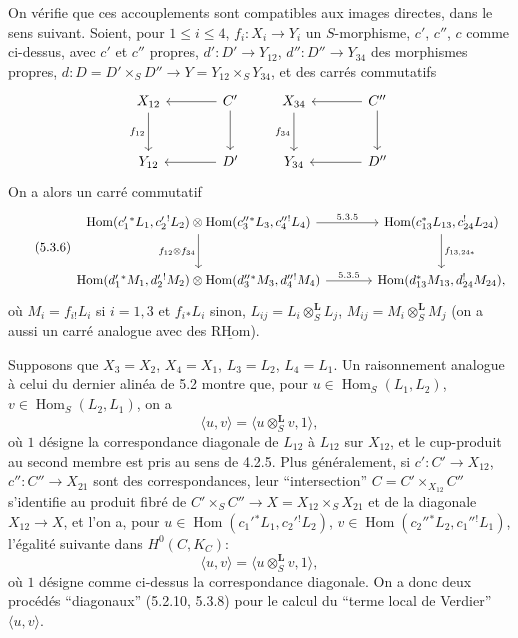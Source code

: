 \documentclass[11pt]{article}
\DeclareMathOperator{\Hom}{Hom}
\providecommand{\RHom}{\mathrm{RHom}}
\providecommand{\uRHom}{\underline{\RHom}}
\providecommand{\RHom}{\mathrm{RHom}}
\providecommand{\Hom}{\operatorname{Hom}}
\providecommand{\RHom}{\mathrm R\mathcal{H}om}
\providecommand{\RHom}{\mathrm{RHom}}
\providecommand{\Hom}{\operatorname{Hom}}
\begin{document}
On vérifie que ces accouplements sont compatibles aux images directes, dans le sens suivant. Soient, pour $1\leq i\leq4$, $f_i:X_i\to Y_i$ un $S$-morphisme, $c'$, $c''$, $c$ comme ci-dessus, avec $c'$ et $c''$ propres, $d':D'\to Y_{12}$, $d'':D''\to Y_{34}$ des morphismes propres, $d:D=D'\times_SD''\to Y=Y_{12}\times_SY_{34}$, et des carrés commutatifs
\[
\begin{tikzcd}[column sep=large,row sep=large]
X_{12} \arrow[d,"f_{12}"'] & C' \arrow[l] \arrow[d] \\
Y_{12} & D' \arrow[l]
\end{tikzcd}
\qquad
\begin{tikzcd}[column sep=large,row sep=large]
X_{34} \arrow[d,"f_{34}"'] & C'' \arrow[l] \arrow[d] \\
Y_{34} & D'' \arrow[l]
\end{tikzcd}
\]
On a alors un carré commutatif
\begin{equation}
\tag{5.3.6}
\begin{tikzcd}[column sep=large,row sep=large]
\Hom(c_1'{}^*L_1,c_2'{}^!L_2)\otimes\Hom(c_3''{}^*L_3,c_4''{}^!L_4) \arrow[r,"5.3.5"] \arrow[d,"f_{12}\otimes f_{34}"']
& \Hom(c_{13}^*L_{13},c_{24}^!L_{24}) \arrow[d,"f_{13,24*}"] \\
\Hom(d_1'{}^*M_1,d_2'{}^!M_2)\otimes\Hom(d_3''{}^*M_3,d_4''{}^!M_4) \arrow[r,"5.3.5"]
& \Hom(d_{13}^*M_{13},d_{24}^!M_{24}),
\end{tikzcd}
\end{equation}
où $M_i=f_{i!}L_i$ si $i=1,3$ et $f_i{}_*L_i$ sinon, $L_{ij}=L_i\otimes_S^{\mathbf L}L_j$, $M_{ij}=M_i\otimes_S^{\mathbf L}M_j$ (on a aussi un carré analogue avec des $\uRHom$).

Supposons que $X_3=X_2$, $X_4=X_1$, $L_3=L_2$, $L_4=L_1$. Un raisonnement analogue à celui du dernier alinéa de 5.2 montre que, pour $u\in\Hom_S(L_1,L_2)$, $v\in\Hom_S(L_2,L_1)$, on a
\begin{equation}
\tag{5.3.7}
\langle u,v\rangle=\langle u\otimes_S^{\mathbf L}v,1\rangle,
\end{equation}
où $1$ désigne la correspondance diagonale de $L_{12}$ à $L_{12}$ sur $X_{12}$, et le cup-produit au second membre est pris au sens de 4.2.5. Plus généralement, si $c':C'\to X_{12}$, $c'':C''\to X_{21}$ sont des correspondances, leur ``intersection'' $C=C'\times_{X_{12}}C''$ s'identifie au produit fibré de $C'\times_SC''\to X=X_{12}\times_SX_{21}$ et de la diagonale $X_{12}\to X$, et l'on a, pour $u\in\Hom(c_1'{}^*L_1,c_2'{}^!L_2)$, $v\in\Hom(c_2''{}^*L_2,c_1''{}^!L_1)$, l'égalité suivante dans $H^0(C,K_C)$:
\begin{equation}
\tag{5.3.8}
\langle u,v\rangle=\langle u\otimes_S^{\mathbf L}v,1\rangle,
\end{equation}
où $1$ désigne comme ci-dessus la correspondance diagonale. On a donc deux procédés ``diagonaux'' (5.2.10, 5.3.8) pour le calcul du ``terme local de Verdier'' $\langle u,v\rangle$.
\end{document}
